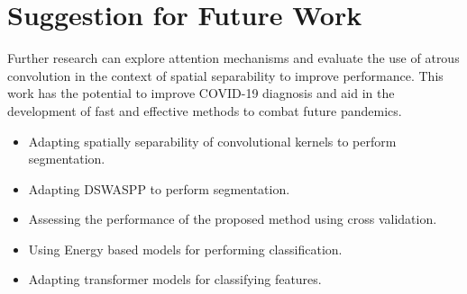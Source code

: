 \section{Suggestion for Future Work}

Further research can explore attention mechanisms and evaluate the use of atrous convolution in the context of spatial separability to improve performance. This work has the potential to improve COVID-19 diagnosis and aid in the development of fast and effective methods to combat future pandemics.
\begin{itemize}
    \item Adapting spatially separability of convolutional kernels to perform segmentation.
    \item Adapting DSWASPP to perform segmentation.
    \item Assessing the performance of the proposed method using cross validation.
    \item Using Energy based models for performing classification.
    \item Adapting transformer models for classifying features.
\end{itemize}